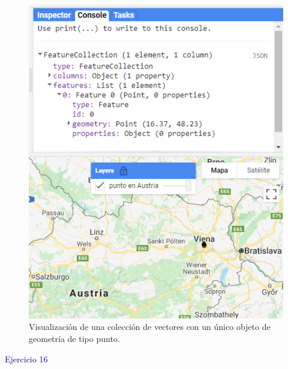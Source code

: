 \documentclass[
  12pt,
  letterpaper,
  twoside]{book}
\begin{document}
\begin{figure}[H]

{\centering \includegraphics[width=0.8\linewidth]{Img/ej15} 

}

\caption{Visualización de una colección de vectores con un único objeto de geometría de tipo punto.}\label{fig:f83}
\end{figure}

\textcolor{darkblue}{Ejercicio 16}
\end{document}
